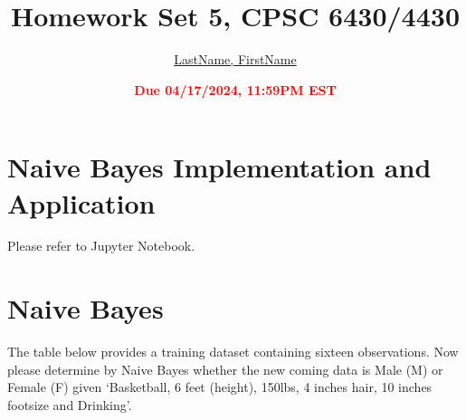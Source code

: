\documentclass[11pt]{article}
\title{{\bf Homework Set 5, CPSC 6430/4430}}
\author{\Large\underline{LastName, FirstName}}
\date{\textbf{\Large\textcolor{red}{Due 04/17/2024, 11:59PM EST}}}
\newcommand{\R}{\mathbb{R}}
\newcommand{\minimize}{\operatorname*{minimize\ }}
\newcommand{\mtx}[1]{\mathbf{#1}}
\newcommand{\vct}[1]{\mathbf{#1}}
\def \mA {\mtx{A}}
\def \mI {\mtx{I}}
\def \mU {\mtx{U}}
\def \mX {\mtx{X}}
\def \mZ {\mtx{Z}}
\def \vv {\vct{v}}
\def \vx {\vct{x}}
\def \vy {\vct{y}}
\def \R {\mathbb{R}}
\begin{document}
\maketitle

\section*{Naive Bayes Implementation and Application}
Please refer to Jupyter Notebook.
\newpage
\section*{Naive Bayes}
The table below provides a training dataset containing sixteen observations. Now please determine by Naive Bayes whether the new coming data is Male (M) or Female (F) given `Basketball, 6 feet (height), 150lbs, 4 inches hair, 10 inches footsize and Drinking'. 
\end{document}

